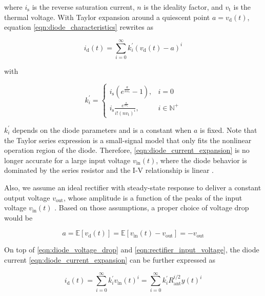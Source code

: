 where ${i_{\text{s}}}$ is the reverse saturation current, $n$ is the ideality factor, and ${{v_{\text{t}}}}$ is the thermal voltage. With Taylor expansion around a quiescent point $a = {v_{\text{d}}}(t)$, equation \ref{eqn:diode_characteristics} rewrites as

\begin{equation}\label{eqn:diode_current_expansion}
  {i_{\text{d}}}(t) = \sum\limits_{i = 0}^\infty  {k_i^\prime } {\left( {{v_{\text{d}}}(t) - a} \right)^i}
\end{equation}

with

\begin{equation}\label{eqn:diode_k_prime}
  k_i^\prime  = \left\{ {
  \begin{array}{*{20}{c}}
    {{i_{\text{s}}}\left( {{e^{\frac{a}{{n{v_{\text{t}}}}}}} - 1} \right),}&{i = 0} \\
    {{i_{\text{s}}}\frac{{{e^{\frac{a}{{n{v_{\text{t}}}}}}}}}{{i!{{\left( {n{v_{\text{t}}}} \right)}^i}}},}&{i \in {\mathbb{N}^ + }}
  \end{array}} \right.
\end{equation}


$k_i^\prime $ depends on the diode parameters and is a constant when $a$ is fixed. Note that the Taylor series expression is a small-signal model that only fits the nonlinear operation region of the diode. Therefore, \eqref{eqn:diode_current_expansion} is no longer accurate for a large input voltage ${v_{{\text{in}}}}(t)$, where the diode behavior is dominated by the series resistor and the I-V relationship is linear \cite{Boaventura2013}.

Also, we assume an ideal rectifier with steady-state response to deliver a constant output voltage ${v_{{\text{out}}}}$, whose amplitude is a function of the peaks of the input voltage ${v_{{\text{in}}}}(t)$ \cite{Curty2005}. Based on those assumptions, a proper choice of voltage drop would be

\begin{equation}\label{eqn:diode_voltage_drop}
  a = \mathbb{E}\left[ {{v_{\text{d}}}(t)} \right] = \mathbb{E}\left[ {{v_{{\text{in}}}}(t) - {v_{{\text{out}}}}} \right] =  - {v_{{\text{out}}}}
\end{equation}

On top of \eqref{eqn:diode_voltage_drop} and \eqref{eqn:rectifier_input_voltage}, the diode current \eqref{eqn:diode_current_expansion} can be further expressed as

\begin{equation}\label{eqn:diode_current}
  {i_{\text{d}}}(t) = \sum\limits_{i = 0}^\infty  {k_i^\prime } {v_{{\text{in}}}}{(t)^i} = \sum\limits_{i = 0}^\infty  {k_i^\prime } R_{{\text{ant}}}^{i/2}y{(t)^i}
\end{equation}

